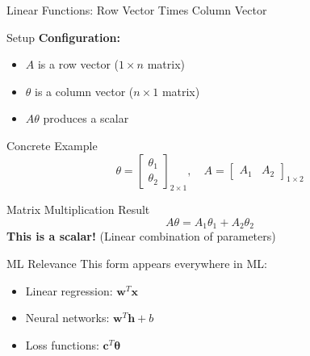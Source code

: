 \documentclass{beamer}
\begin{document}
\begin{frame}{Linear Functions: Row Vector Times Column Vector}
\begin{definitionbox}{Setup}
\textbf{Configuration:}
\begin{itemize}
\item $A$ is a row vector ($1 \times n$ matrix)
\item $\theta$ is a column vector ($n \times 1$ matrix) 
\item $A\theta$ produces a scalar
\end{itemize}
\end{definitionbox}

\begin{examplebox}{Concrete Example}
$$\theta = \begin{bmatrix}
\theta_{1}\\
\theta_{2}
\end{bmatrix}_{2\times 1}, \quad A = \begin{bmatrix}
A_{1} & A_{2}
\end{bmatrix}_{1 \times 2}$$
\end{examplebox}

\begin{keypointsbox}{Matrix Multiplication Result}
$$A\theta = A_{1}\theta_{1} + A_{2}\theta_{2}$$
\textbf{This is a scalar!} (Linear combination of parameters)
\end{keypointsbox}

\begin{alertbox}{ML Relevance}
This form appears everywhere in ML:
\begin{itemize}
\item Linear regression: $\mathbf{w}^T\mathbf{x}$
\item Neural networks: $\mathbf{w}^T\mathbf{h} + b$
\item Loss functions: $\mathbf{c}^T\mathbf{\theta}$
\end{itemize}
\end{alertbox}
\end{frame}
\end{document}
